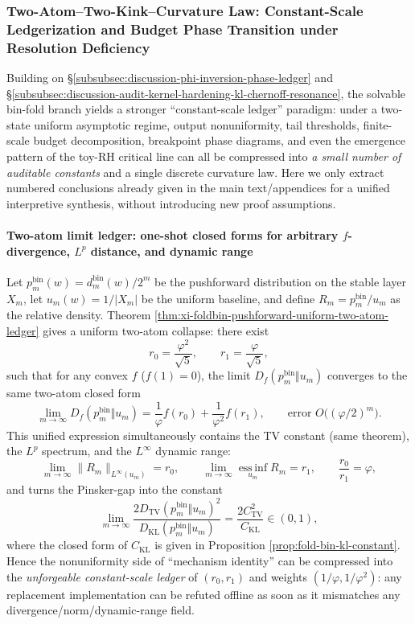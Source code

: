 ﻿%

\subsubsection{Two-Atom--Two-Kink--Curvature Law: Constant-Scale Ledgerization and Budget Phase Transition under Resolution Deficiency}\label{subsubsec:discussion-two-atom-ledger-curvature-bias-toy-rh}
Building on \S\ref{subsubsec:discussion-phi-inversion-phase-ledger} and \S\ref{subsubsec:discussion-audit-kernel-hardening-kl-chernoff-resonance}, the solvable bin-fold branch yields a stronger ``constant-scale ledger'' paradigm:
under a two-state uniform asymptotic regime, output nonuniformity, tail thresholds, finite-scale budget decomposition, breakpoint phase diagrams, and even the emergence pattern of the toy-RH critical line can all be compressed into \emph{a small number of auditable constants} and a single discrete curvature law.
Here we only extract numbered conclusions already given in the main text/appendices for a unified interpretive synthesis, without introducing new proof assumptions.

\paragraph{Two-atom limit ledger: one-shot closed forms for arbitrary \texorpdfstring{$f$}{f}-divergence, \texorpdfstring{$L^p$}{Lp} distance, and dynamic range}
Let \(p_m^{\mathrm{bin}}(w)=d_m^{\mathrm{bin}}(w)/2^m\) be the pushforward distribution on the stable layer \(X_m\), let \(u_m(w)=1/|X_m|\) be the uniform baseline, and define \(R_m=p_m^{\mathrm{bin}}/u_m\) as the relative density.
Theorem \ref{thm:xi-foldbin-pushforward-uniform-two-atom-ledger} gives a uniform two-atom collapse: there exist
\[
r_0=\frac{\varphi^2}{\sqrt5},\qquad r_1=\frac{\varphi}{\sqrt5},
\]
such that for any convex \(f\) (\(f(1)=0\)), the limit \(D_f(p_m^{\mathrm{bin}}\Vert u_m)\) converges to the same two-atom closed form
\[
\lim_{m\to\infty}D_f(p_m^{\mathrm{bin}}\Vert u_m)
=\frac{1}{\varphi}f(r_0)+\frac{1}{\varphi^2}f(r_1),
\qquad
\text{error }O\!\bigl((\varphi/2)^m\bigr).
\]
This unified expression simultaneously contains the TV constant (same theorem), the \(L^p\) spectrum, and the \(L^\infty\) dynamic range:
\[
\lim_{m\to\infty}\|R_m\|_{L^\infty(u_m)}=r_0,\qquad
\lim_{m\to\infty}\operatorname*{ess\,inf}_{u_m}R_m=r_1,\qquad
\frac{r_0}{r_1}=\varphi,
\]
and turns the Pinsker-gap into the constant
\[
\lim_{m\to\infty}\frac{2D_{\mathrm{TV}}(p_m^{\mathrm{bin}}\Vert u_m)^2}{D_{\mathrm{KL}}(p_m^{\mathrm{bin}}\Vert u_m)}
=\frac{2C_{\mathrm{TV}}^2}{C_{\mathrm{KL}}}\in(0,1),
\]
where the closed form of \(C_{\mathrm{KL}}\) is given in Proposition \ref{prop:fold-bin-kl-constant}.
Hence the nonuniformity side of ``mechanism identity'' can be compressed into the \emph{unforgeable constant-scale ledger} of \((r_0,r_1)\) and weights \((1/\varphi,1/\varphi^2)\): any replacement implementation can be refuted offline as soon as it mismatches any divergence/norm/dynamic-range field.

